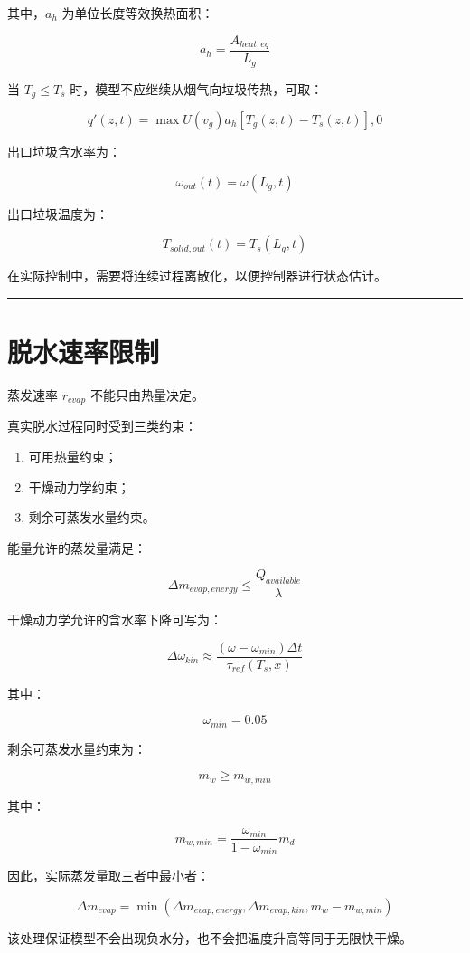 \documentclass[UTF8,openany,zihao=-4,oneside]{ctexbook}
\providecommand{\tightlist}{\setlength{\itemsep}{0pt}\setlength{\parskip}{0pt}}
\newcommand{\manualdivider}{\par\vspace{0.6em}\noindent\textcolor{FGLine}{\rule{\linewidth}{0.7pt}}\vspace{0.6em}\par}
\begin{document}
其中，\(a_h\) 为单位长度等效换热面积：

\[
a_h=\frac{A_{heat,eq}}{L_g}
\]

当 \(T_g\le T_s\) 时，模型不应继续从烟气向垃圾传热，可取：

\[
q'(z,t)=\max{U(v_g)a_h[T_g(z,t)-T_s(z,t)],0}
\]

出口垃圾含水率为：

\[
\omega_{out}(t)=\omega(L_g,t)
\]

出口垃圾温度为：

\[
T_{solid,out}(t)=T_s(L_g,t)
\]

在实际控制中，需要将连续过程离散化，以便控制器进行状态估计。

\manualdivider

\section{脱水速率限制}\label{ux8131ux6c34ux901fux7387ux9650ux5236}

蒸发速率 \(r_{evap}\) 不能只由热量决定。

真实脱水过程同时受到三类约束：

\begin{enumerate}
\def\labelenumi{\arabic{enumi}.}
\tightlist
\item
  可用热量约束；
\item
  干燥动力学约束；
\item
  剩余可蒸发水量约束。
\end{enumerate}

能量允许的蒸发量满足：

\[
\Delta m_{evap,energy}\le\frac{Q_{available}}{\lambda}
\]

干燥动力学允许的含水率下降可写为：

\[
\Delta\omega_{kin}\approx\frac{(\omega-\omega_{min})\Delta t}{\tau_{ref}(T_s,x)}
\]

其中：

\[
\omega_{min}=0.05
\]

剩余可蒸发水量约束为：

\[
m_w\ge m_{w,min}
\]

其中：

\[
m_{w,min}=\frac{\omega_{min}}{1-\omega_{min}}m_d
\]

因此，实际蒸发量取三者中最小者：

\[
\Delta m_{evap}=\min\left(\Delta m_{evap,energy},\Delta m_{evap,kin},m_w-m_{w,min}\right)
\]

该处理保证模型不会出现负水分，也不会把温度升高等同于无限快干燥。
\end{document}
